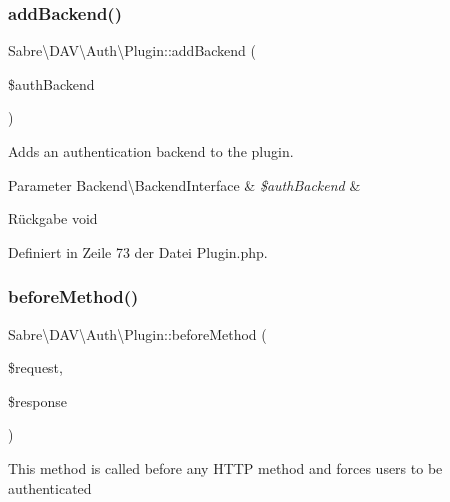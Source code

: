 \subsubsection{\texorpdfstring{add\+Backend()}{addBackend()}}
{\footnotesize\ttfamily Sabre\textbackslash{}\+D\+A\+V\textbackslash{}\+Auth\textbackslash{}\+Plugin\+::add\+Backend (\begin{DoxyParamCaption}\item[{\mbox{\hyperlink{interface_sabre_1_1_d_a_v_1_1_auth_1_1_backend_1_1_backend_interface}{Backend\textbackslash{}\+Backend\+Interface}}}]{\$auth\+Backend }\end{DoxyParamCaption})}

Adds an authentication backend to the plugin.


\begin{DoxyParams}[1]{Parameter}
Backend\textbackslash{}\+Backend\+Interface & {\em \$auth\+Backend} & \\
\hline
\end{DoxyParams}
\begin{DoxyReturn}{Rückgabe}
void 
\end{DoxyReturn}


Definiert in Zeile 73 der Datei Plugin.\+php.

\mbox{\label{class_sabre_1_1_d_a_v_1_1_auth_1_1_plugin_a82bf49257f655c8d35789c7538843485}} 
\subsubsection{\texorpdfstring{before\+Method()}{beforeMethod()}}
{\footnotesize\ttfamily Sabre\textbackslash{}\+D\+A\+V\textbackslash{}\+Auth\textbackslash{}\+Plugin\+::before\+Method (\begin{DoxyParamCaption}\item[{\mbox{\hyperlink{interface_sabre_1_1_h_t_t_p_1_1_request_interface}{Request\+Interface}}}]{\$request,  }\item[{\mbox{\hyperlink{interface_sabre_1_1_h_t_t_p_1_1_response_interface}{Response\+Interface}}}]{\$response }\end{DoxyParamCaption})}

This method is called before any H\+T\+TP method and forces users to be authenticated


